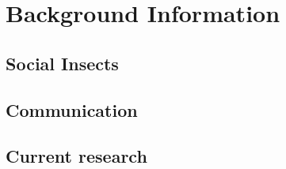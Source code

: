 \chapter{Background Information}
\label{ch:background-information}

\section {Social Insects}
\section {Communication}
\section{Current research}